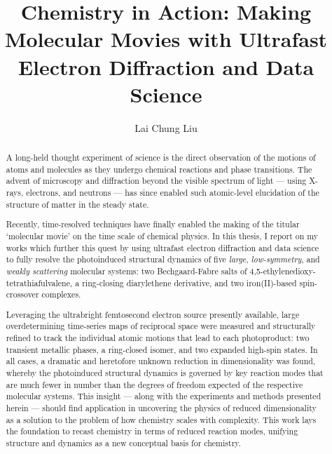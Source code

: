 \documentclass[12pt]{ut-thesis}
\author{Lai Chung Liu}
\title{Chemistry in Action: Making Molecular Movies with Ultrafast Electron Diffraction and Data Science}
\begin{document}

  \begin{preliminary}

    \maketitle %

    \cleardoublepage{}

    \begin{abstract}

      A long-held thought experiment of science is the direct observation of the motions
      of atoms and molecules as they undergo chemical reactions and phase transitions.
      The advent of microscopy and diffraction beyond the visible spectrum of light ---
      using X-rays, electrons, and neutrons --- has since enabled such atomic-level elucidation
      of the structure of matter in the steady state.

      Recently, time-resolved techniques have finally enabled the making of
      the titular `molecular movie' on the time scale of chemical physics.
      In this thesis, I report on my works which further this quest
      by using ultrafast electron diffraction and data science to fully resolve
      the photoinduced structural dynamics of five \emph{large}, \emph{low-symmetry},
      and \emph{weakly scattering} molecular systems:
      two Bechgaard-Fabre salts of 4,5-ethylenedioxy-tetrathiafulvalene,
      a ring-closing diarylethene derivative, and two iron(II)-based spin-crossover complexes.

      Leveraging the ultrabright femtosecond electron source presently available,
      large overdetermining time-series maps of reciprocal space
      were measured and structurally refined to track the individual atomic motions
      that lead to each photoproduct: two transient metallic phases, a ring-closed isomer,
      and two expanded high-spin states.
      In all cases, a dramatic and heretofore unknown reduction in dimensionality was found,
      whereby the photoinduced structural dynamics is governed by key reaction modes
      that are much fewer in number than the degrees of freedom expected
      of the respective molecular systems.
      This insight --- along with the experiments and methods presented herein ---
      should find application in uncovering the physics of reduced dimensionality
      as a solution to the problem of how chemistry scales with complexity.
      This work lays the foundation to recast chemistry in terms of
      reduced reaction modes, unifying structure and dynamics
      as a new conceptual basis for chemistry.


\end{abstract}
\end{preliminary}
\end{document}
